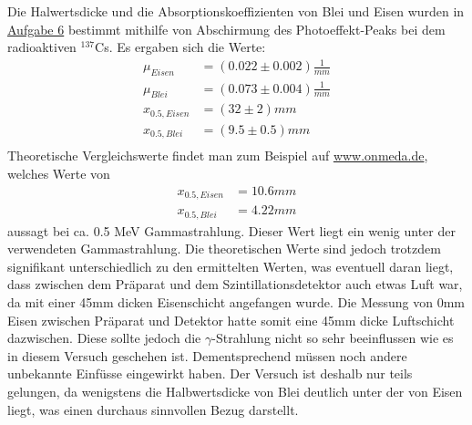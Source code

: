 \documentclass[11pt,a4paper]{article}
\begin{document}
   Die Halwertsdicke und die Absorptionskoeffizienten von Blei und Eisen wurden in \underline{Aufgabe 6} bestimmt mithilfe von Abschirmung des Photoeffekt-Peaks bei dem radioaktiven $^{137}$Cs. Es ergaben sich die Werte:
   \begin{align}
   	\mu_{Eisen} &= (0.022 \pm 0.002) \frac{1}{mm}\\
   	\mu_{Blei} &= (0.073 \pm 0.004) \frac{1}{mm}\\
   	x_{0.5,Eisen} &= (32 \pm 2)mm\\
   	x_{0.5,Blei} &= (9.5 \pm 0.5)mm\\   	
   \end{align}
   Theoretische Vergleichswerte findet man zum Beispiel auf \url{www.onmeda.de}, welches Werte von
   \begin{align}
   	x_{0.5,Eisen} &= 10.6 mm\\
   	x_{0.5,Blei} &= 4.22 mm
   \end{align}
   aussagt bei ca. 0.5 MeV Gammastrahlung. Dieser Wert liegt ein wenig unter der verwendeten Gammastrahlung. 
   Die theoretischen Werte sind jedoch trotzdem signifikant unterschiedlich zu den ermittelten Werten, was eventuell daran liegt, dass zwischen dem Pr\"aparat und dem Szintillationsdetektor auch etwas Luft war, 
   da mit einer 45mm dicken Eisenschicht angefangen wurde. Die Messung von 0mm Eisen zwischen Pr\"aparat und Detektor hatte somit eine 45mm dicke Luftschicht dazwischen. 
   Diese sollte jedoch die $\gamma$-Strahlung nicht so sehr beeinflussen wie es in diesem Versuch geschehen ist. 
   Dementsprechend m\"ussen noch andere unbekannte Einf\"usse eingewirkt haben.
   Der Versuch ist deshalb nur teils gelungen, da wenigstens die Halbwertsdicke von Blei deutlich unter der von Eisen liegt, 
   was einen durchaus sinnvollen Bezug darstellt.
\end{document}
